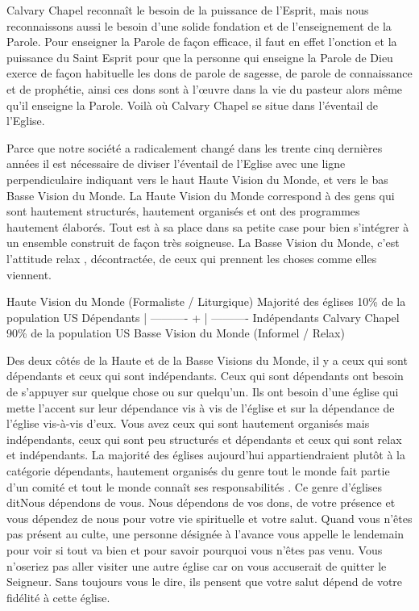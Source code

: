 Calvary Chapel reconnaît le besoin de la puissance de l’Esprit, mais nous reconnaissons aussi le besoin d’une solide
fondation et de l’enseignement de la Parole. Pour enseigner la Parole de façon efficace, il faut en effet l’onction et la
puissance du Saint Esprit pour que la personne qui enseigne la Parole de Dieu exerce de façon habituelle les dons de
parole de sagesse, de parole de connaissance et de prophétie, ainsi ces dons sont à l'œuvre dans la vie du pasteur
alors même qu’il enseigne la Parole. Voilà où Calvary Chapel se situe dans l’éventail de l’Eglise.

Parce que notre société a radicalement changé dans les trente cinq dernières années il est nécessaire de diviser
l’éventail de l’Eglise avec une ligne perpendiculaire indiquant vers le haut \og Haute Vision du Monde\fg{}, et vers le bas
\og Basse Vision du Monde\fg{}. La Haute Vision du Monde correspond à des gens qui sont hautement structurés,
hautement organisés et ont des programmes hautement élaborés. Tout est à sa place dans sa petite case pour bien
s'intégrer à un ensemble construit de façon très soigneuse. La Basse Vision du Monde, c’est l’attitude \og relax \fg{},
décontractée, de ceux qui prennent les choses comme elles viennent.


Haute Vision du Monde
(Formaliste / Liturgique)
Majorité des églises
10\% de la population US
Dépendants
|
----------
+
|
----------
Indépendants
Calvary Chapel
90\% de la population US
Basse Vision du Monde
(Informel / Relax)

Des deux côtés de la Haute et de la Basse Visions du Monde, il y a ceux qui sont dépendants et ceux qui sont
indépendants. Ceux qui sont dépendants ont besoin de s’appuyer sur quelque chose ou sur quelqu'un. Ils ont besoin
d’une église qui mette l’accent sur leur dépendance vis à vis de l’église et sur la dépendance de l’église vis-à-vis d’eux.
Vous avez ceux qui sont hautement organisés mais indépendants, ceux qui sont peu structurés et dépendants et ceux
qui sont relax et indépendants. La majorité des églises aujourd’hui appartiendraient plutôt à la catégorie \og dépendants,
hautement organisés \fg{} du genre \og tout le monde fait partie d’un comité \fg{} et \og tout le monde connaît ses responsabilités \fg{}.
Ce genre d’églises dit\frcolon\og Nous dépendons de vous.\fg{} Nous dépendons de vos dons, de votre présence et vous
dépendez de nous pour votre vie spirituelle et votre salut. Quand vous n’êtes pas présent au culte, une personne
désignée à l’avance vous appelle le lendemain pour voir si tout va bien et pour savoir pourquoi vous n’êtes pas venu.
Vous n’oseriez pas aller visiter une autre église car on vous accuserait de quitter le Seigneur. Sans toujours vous le
dire, ils pensent que votre salut dépend de votre fidélité à cette église.

